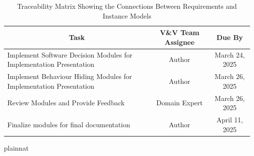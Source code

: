 \documentclass[12pt, titlepage]{article}
\begin{document}
\begin{table}[H]
  \centering
  \renewcommand{\arraystretch}{1.3} %
  \begin{tabular}{|p{7cm}|c|c|}
  \hline
  \multicolumn{1}{|c|}{\textbf{Task}} & \textbf{V\&V Team Assignee} & \textbf{Due By} \\ \hline
  \raggedright Implement Software Decision Modules for Implementation Presentation & Author & March 24, 2025 \\ \hline
  \raggedright Implement Behaviour Hiding Modules for Implementation Presentation & Author & March 26, 2025 \\ \hline
  \raggedright Review Modules and Provide Feedback & Domain Expert & March 26, 2025 \\ \hline
  \raggedright Finalize modules for final documentation & Author & April 11, 2025 \\ \hline
  \end{tabular}
  \caption{Traceability Matrix Showing the Connections Between Requirements and Instance Models}
  \label{MG_Timeline}
\end{table}
  
 {plainnat}


\newpage{}
\end{document}
